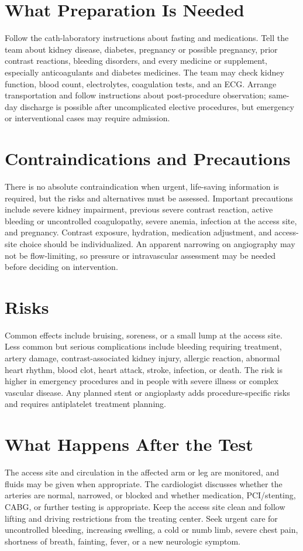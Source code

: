 \section*{What Preparation Is Needed}
Follow the cath-laboratory instructions about fasting and medications. Tell the team about kidney disease, diabetes, pregnancy or possible pregnancy, prior contrast reactions, bleeding disorders, and every medicine or supplement, especially anticoagulants and diabetes medicines. The team may check kidney function, blood count, electrolytes, coagulation tests, and an ECG. Arrange transportation and follow instructions about post-procedure observation; same-day discharge is possible after uncomplicated elective procedures, but emergency or interventional cases may require admission.

\section*{Contraindications and Precautions}
There is no absolute contraindication when urgent, life-saving information is required, but the risks and alternatives must be assessed. Important precautions include severe kidney impairment, previous severe contrast reaction, active bleeding or uncontrolled coagulopathy, severe anemia, infection at the access site, and pregnancy. Contrast exposure, hydration, medication adjustment, and access-site choice should be individualized. An apparent narrowing on angiography may not be flow-limiting, so pressure or intravascular assessment may be needed before deciding on intervention.

\section*{Risks}
Common effects include bruising, soreness, or a small lump at the access site. Less common but serious complications include bleeding requiring treatment, artery damage, contrast-associated kidney injury, allergic reaction, abnormal heart rhythm, blood clot, heart attack, stroke, infection, or death. The risk is higher in emergency procedures and in people with severe illness or complex vascular disease. Any planned stent or angioplasty adds procedure-specific risks and requires antiplatelet treatment planning.

\section*{What Happens After the Test}
The access site and circulation in the affected arm or leg are monitored, and fluids may be given when appropriate. The cardiologist discusses whether the arteries are normal, narrowed, or blocked and whether medication, PCI/stenting, CABG, or further testing is appropriate. Keep the access site clean and follow lifting and driving restrictions from the treating center. Seek urgent care for uncontrolled bleeding, increasing swelling, a cold or numb limb, severe chest pain, shortness of breath, fainting, fever, or a new neurologic symptom.

